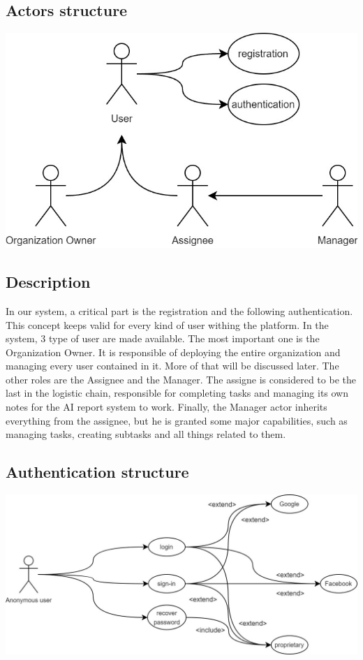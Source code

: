 \documentclass{article}
\begin{document}
\subsection{Actors structure}
\includegraphics[width=\textwidth, height=\textheight, keepaspectratio]{images/UseCaseDiagram/UseCaseUser.jpg}
\subsection*{Description}
In our system, a critical part is the registration and the following authentication. This concept keeps valid for every kind of user withing the platform.
In the system, 3 type of user are made available.
The most important one is the Organization Owner. It is responsible of deploying the entire organization and managing every user contained in it. More of that will be discussed later.
The other roles are the Assignee and the Manager. The assigne is considered to be the last in the logistic chain, responsible for completing tasks and managing its own notes for the AI report system to work.
Finally, the Manager actor inherits everything from the assignee, but he is granted some major capabilities, such as managing tasks, creating subtasks and all things related to them.
\subsection{Authentication structure}
\includegraphics[width=\textwidth, keepaspectratio]{images/UseCaseDiagram/UseCaseAuthentication.jpg}
\end{document}
